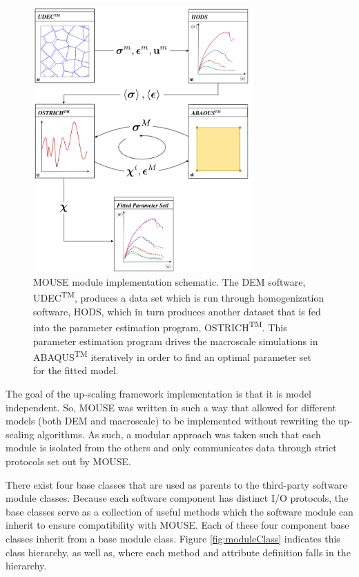 \begin{figure}[p]
\begin{center}
\includegraphics[width=0.75\textwidth]{figures/Chapter4/UpScalingFlowChart}
\caption{{\label{fig:upscalingflowchart} MOUSE module implementation schematic. The DEM software, UDEC\textsuperscript{TM}, produces a data set which is run through homogenization software, HODS, which in turn produces another dataset that is fed into the parameter estimation program, OSTRICH\textsuperscript{TM}. This parameter estimation program drives the macroscale simulations in ABAQUS\textsuperscript{TM} iteratively in order to find an optimal parameter set for the fitted model.%
}}
\end{center}
\end{figure}

The goal of the up-scaling framework implementation is that it is model independent. So, MOUSE was written in such a way that allowed for different models (both DEM and macroscale) to be implemented without rewriting the up-scaling algorithms. As such, a modular approach was taken such that each module is isolated from the others and only communicates data through strict protocols set out by MOUSE.

There exist four base classes that are used as parents to the third-party software module classes. Because each software component has distinct I/O protocols, the base classes serve as a collection of useful methods which the software module can inherit to ensure compatibility with MOUSE. Each of these four component base classes inherit from a base module class. Figure \ref{fig:moduleClass} indicates this class hierarchy, as well as, where each method and attribute definition falls in the hierarchy.

